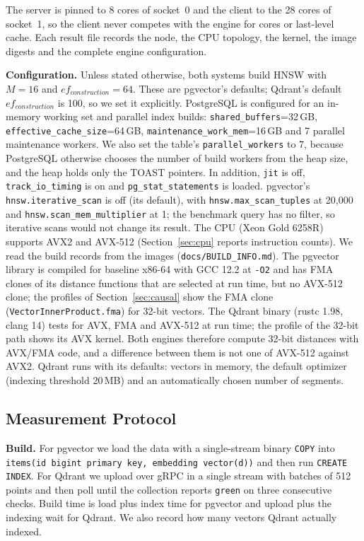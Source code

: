 \documentclass[sigconf, nonacm]{acmart}
\begin{document}
The server is pinned to 8 cores of socket~0 and the client to the 28 cores of socket~1,
so the client never competes with the engine for cores or last-level cache. Each result
file records the node, the CPU topology, the kernel, the image digests and the complete
engine configuration.

\textbf{Configuration.} Unless stated otherwise, both systems build HNSW with $M=16$ and
$ef_{construction}=64$. These are pgvector's defaults; Qdrant's default
$ef_{construction}$ is 100, so we set it explicitly. PostgreSQL is configured for an
in-memory working set and parallel index builds: \texttt{shared\_buffers}=32\,GB,
\texttt{effective\_cache\_size}=64\,GB, \texttt{maintenance\_work\_mem}=16\,GB and
7 parallel maintenance workers. We also set the table's \texttt{parallel\_workers} to 7,
because PostgreSQL otherwise chooses the number of build workers from the heap size, and
the heap holds only the TOAST pointers. In addition, \texttt{jit} is off,
\texttt{track\_io\_timing} is on and \texttt{pg\_stat\_statements} is loaded. pgvector's
\texttt{hnsw.iterative\_scan} is off (its default), with \texttt{hnsw.max\_scan\_tuples} at
20{,}000 and \texttt{hnsw.scan\_mem\_multiplier} at 1; the benchmark query has no filter, so
iterative scans would not change its result. The CPU (Xeon Gold 6258R) supports AVX2 and AVX-512 (Section~\ref{sec:cpu}
reports instruction counts). We read the build records from the images (\texttt{docs/BUILD\_INFO.md}). The pgvector
library is compiled for baseline x86-64 with GCC 12.2 at \texttt{-O2} and has FMA clones of its distance functions that are
selected at run time, but no AVX-512 clone; the profiles of Section~\ref{sec:causal} show the FMA clone (\texttt{VectorInnerProduct.fma})
for 32-bit vectors. The Qdrant binary (rustc 1.98, clang 14) tests for AVX, FMA and AVX-512 at run time; the profile of the 32-bit path shows
its AVX kernel. Both engines therefore compute 32-bit distances with AVX/FMA code, and a difference between them is not one of AVX-512 against AVX2.
Qdrant runs with its defaults: vectors in memory, the default optimizer (indexing threshold 20\,MB)
and an automatically chosen number of segments.

\subsection{Measurement Protocol}
\label{sec:protocol}

\textbf{Build.} For pgvector we load the data with a single-stream binary \texttt{COPY}
into \texttt{items(id bigint primary key, embedding vector(d))} and then run
\texttt{CREATE INDEX}. For Qdrant we upload over gRPC in a single stream with batches of
512 points and then poll until the collection reports \texttt{green} on three
consecutive checks. Build time is load plus index time for pgvector and upload plus the
indexing wait for Qdrant. We also record how many vectors Qdrant actually indexed.
\end{document}
